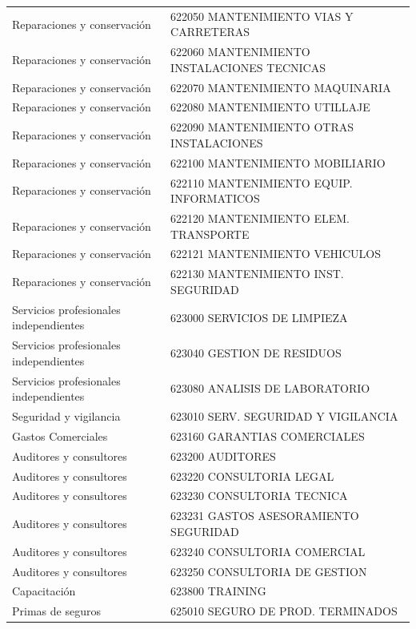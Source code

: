 \documentclass[11pt,letterpaper]{article}
\begin{document}
\begin{xltabular}{\textwidth}{L{5.2cm} Y}
 Reparaciones y conservación & 622050 MANTENIMIENTO VIAS Y CARRETERAS \\
Reparaciones y conservación & 622060 MANTENIMIENTO INSTALACIONES TECNICAS \\
 Reparaciones y conservación & 622070 MANTENIMIENTO MAQUINARIA \\
Reparaciones y conservación & 622080 MANTENIMIENTO UTILLAJE \\
 Reparaciones y conservación & 622090 MANTENIMIENTO OTRAS INSTALACIONES \\
Reparaciones y conservación & 622100 MANTENIMIENTO MOBILIARIO \\
 Reparaciones y conservación & 622110 MANTENIMIENTO EQUIP. INFORMATICOS \\
Reparaciones y conservación & 622120 MANTENIMIENTO ELEM. TRANSPORTE \\
 Reparaciones y conservación & 622121 MANTENIMIENTO VEHICULOS \\
Reparaciones y conservación & 622130 MANTENIMIENTO INST. SEGURIDAD \\
 Servicios profesionales independientes & 623000 SERVICIOS DE LIMPIEZA \\
Servicios profesionales independientes & 623040 GESTION DE RESIDUOS \\
 Servicios profesionales independientes & 623080 ANALISIS DE LABORATORIO \\
Seguridad y vigilancia & 623010 SERV. SEGURIDAD Y VIGILANCIA \\
 Gastos Comerciales & 623160 GARANTIAS COMERCIALES \\
Auditores y consultores & 623200 AUDITORES \\
 Auditores y consultores & 623220 CONSULTORIA LEGAL \\
Auditores y consultores & 623230 CONSULTORIA TECNICA \\
 Auditores y consultores & 623231 GASTOS ASESORAMIENTO SEGURIDAD \\
Auditores y consultores & 623240 CONSULTORIA COMERCIAL \\
 Auditores y consultores & 623250 CONSULTORIA DE GESTION \\
Capacitación & 623800 TRAINING \\
 Primas de seguros & 625010 SEGURO DE PROD. TERMINADOS \\

\end{xltabular}
\end{document}
